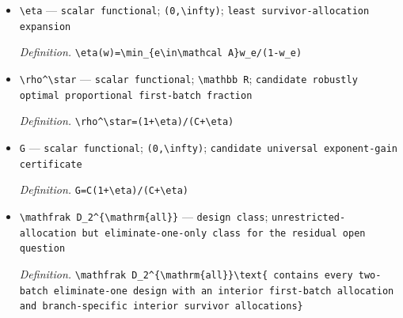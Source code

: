 \documentclass{article}
\begin{document}
\begin{itemize}
  \par\smallskip\noindent\emph{Definition.} \texttt{C(v)=\allowbreak{}\textbackslash{}\allowbreak{}min\_\allowbreak{}\{h\textbackslash{}\allowbreak{}in\textbackslash{}\allowbreak{}mathcal A\}\allowbreak{}C\_\allowbreak{}h(v)}
  \item \texttt{\textbackslash{}\allowbreak{}eta} --- \texttt{scalar functional}; \texttt{(0,\allowbreak{}\textbackslash{}\allowbreak{}infty)}; \texttt{least survivor-\allowbreak{}allocation expansion}
  \par\smallskip\noindent\emph{Definition.} \texttt{\textbackslash{}\allowbreak{}eta(w)=\allowbreak{}\textbackslash{}\allowbreak{}min\_\allowbreak{}\{e\textbackslash{}\allowbreak{}in\textbackslash{}\allowbreak{}mathcal A\}\allowbreak{}w\_\allowbreak{}e/\allowbreak{}(1-\allowbreak{}w\_\allowbreak{}e)}
  \item \texttt{\textbackslash{}\allowbreak{}rho\textasciicircum{}\textbackslash{}\allowbreak{}star} --- \texttt{scalar functional}; \texttt{\textbackslash{}\allowbreak{}mathbb R}; \texttt{candidate robustly optimal proportional first-\allowbreak{}batch fraction}
  \par\smallskip\noindent\emph{Definition.} \texttt{\textbackslash{}\allowbreak{}rho\textasciicircum{}\textbackslash{}\allowbreak{}star=\allowbreak{}(1+\allowbreak{}\textbackslash{}\allowbreak{}eta)/\allowbreak{}(C+\allowbreak{}\textbackslash{}\allowbreak{}eta)}
  \item \texttt{G} --- \texttt{scalar functional}; \texttt{(0,\allowbreak{}\textbackslash{}\allowbreak{}infty)}; \texttt{candidate universal exponent-\allowbreak{}gain certificate}
  \par\smallskip\noindent\emph{Definition.} \texttt{G=\allowbreak{}C(1+\allowbreak{}\textbackslash{}\allowbreak{}eta)/\allowbreak{}(C+\allowbreak{}\textbackslash{}\allowbreak{}eta)}
  \item \texttt{\textbackslash{}\allowbreak{}mathfrak D\_\allowbreak{}2\textasciicircum{}\{\textbackslash{}\allowbreak{}mathrm\{all\}\allowbreak{}\}\allowbreak{}} --- \texttt{design class}; \texttt{unrestricted-\allowbreak{}allocation but eliminate-\allowbreak{}one-\allowbreak{}only class for the residual open question}
  \par\smallskip\noindent\emph{Definition.} \texttt{\textbackslash{}\allowbreak{}mathfrak D\_\allowbreak{}2\textasciicircum{}\{\textbackslash{}\allowbreak{}mathrm\{all\}\allowbreak{}\}\allowbreak{}\textbackslash{}\allowbreak{}text\{ contains every two-\allowbreak{}batch eliminate-\allowbreak{}one design with an interior first-\allowbreak{}batch allocation and branch-\allowbreak{}specific interior survivor allocations\}\allowbreak{}}

\end{itemize}
\end{document}

